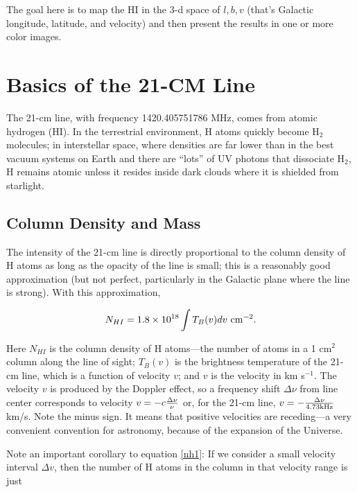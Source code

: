 \documentclass[psfig,preprint]{aastex}
\begin{document}
The goal here is to map the HI in the 3-d space of ${l, b, v}$ (that's
Galactic longitude, latitude, and velocity) and then present the results
in one or more color images.

\section{Basics of the 21-CM Line} \label{basics}

\noindent
	The 21-cm line, with frequency 1420.405751786 MHz, comes from
atomic hydrogen (HI).  In the terrestrial environment, H atoms quickly
become H$_2$ molecules; in interstellar space, where densities are far
lower than in the best vacuum systems on Earth and there are ``lots'' of
UV photons that dissociate H$_2$, H remains atomic unless it resides
inside dark clouds where it is shielded from starlight.

\subsection{Column Density and Mass} \label{coldensity}

\noindent
	The intensity of the 21-cm line is directly proportional to the
column density of H atoms as long as the opacity of the line is small;
this is a reasonably good approximation (but not perfect, particularly
in the Galactic plane where the line is strong). With this
approximation, 

\begin{equation} \label{nh1}
N_{HI} = 1.8 \times 10^{18} \int T_{B}(v) dv \ {\rm cm^{-2}}. 
\end{equation}

\noindent Here $N_{HI}$ is the column density of H atoms---the number of
atoms in a 1 cm$^2$ column along the line of sight; $T_{B}(v)$ is the
brightness temperature of the 21-cm line, which is a function of 
velocity $v$; and $v$ is the velocity in km s$^{-1}$. The velocity $v$
is produced by the Doppler effect, so a frequency shift $\Delta \nu$
from line center corresponds to velocity $v = - c {\Delta \nu \over
\nu}$ or, for the 21-cm line, $v = -{\Delta \nu \over 4.73 {\rm kHz}}$ km/s.
Note the minus sign. It means that positive velocities are receding---a
very convenient convention for astronomy, because of the expansion of
the Universe. 

          Note an important corollary to equation \ref{nh1}: If we
consider a small velocity interval $\Delta v$, then the number of H
atoms in the column in that velocity range is just 
\end{document}
